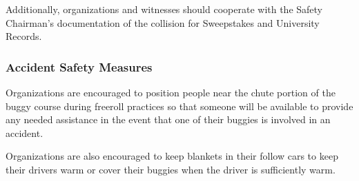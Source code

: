 	Additionally, organizations and witnesses should cooperate with the Safety
	Chairman's documentation of the collision for Sweepstakes and University
	Records.
	
	\subsubsection{Accident Safety Measures}
	Organizations are encouraged to position people near the chute portion of the
	buggy course during freeroll practices so that someone will be available to
	provide any needed assistance in the event that one of their buggies is
	involved in an accident. 
	
	Organizations are also encouraged to keep blankets
	in their follow cars to keep their drivers warm or cover their buggies when the
	driver is sufficiently warm.
	